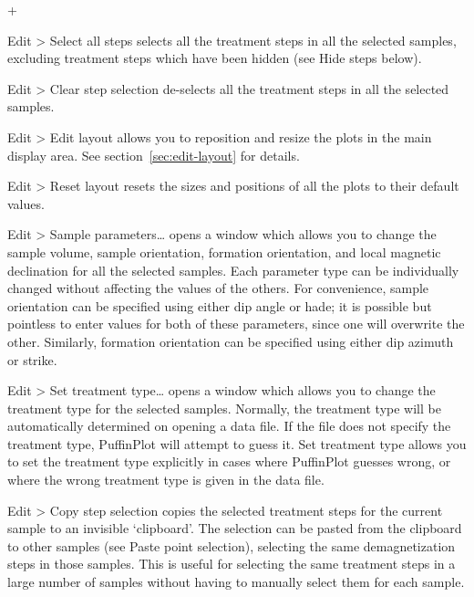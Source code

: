 \documentclass[a4paper,british]{article}
\newcommand{\menuitemlabel}[1]{%
\mbox{\textsf{#1}}\hfil}
\newenvironment{menuitemlist}%
{\begin{list}{}{%
\renewcommand{\makelabel}{\menuitemlabel}%
\setlength{\labelwidth}{35pt}%
\setlength{\leftmargin}%
             {\labelwidth+\labelsep}}}%
{\end{list}}
\newcommand{\ppcmd}[1]{\textsf{#1}} %
\newcommand{\submenu}{ \textgreater{} } %
\begin{document}
\begin{menuitemlist}

\item[Edit\submenu Select all steps] selects all the treatment steps in all
  the selected samples, excluding treatment steps which have been hidden (see
  \ppcmd{Hide steps} below).

\item[Edit\submenu Clear step selection] de-selects all the treatment steps
  in all the selected samples.

\item[Edit\submenu Edit layout] allows you to reposition and resize the plots
  in the main display area. See section~\ref{sec:edit-layout} for details.

\item[Edit\submenu Reset layout] resets the sizes and positions of all the
  plots to their default values.

\item[Edit\submenu Sample parameters\ldots] opens a window which allows
  you to change the sample volume, sample orientation, formation
  orientation, and local magnetic declination for all the selected
  samples. Each parameter type can be individually changed without
  affecting the values of the others. For convenience, sample
  orientation can be specified using either dip angle or hade; it is
  possible but pointless to enter values for both of these parameters,
  since one will overwrite the other. Similarly, formation orientation
  can be specified using either dip azimuth or strike.

\item[Edit\submenu Set treatment type\ldots] opens a window which allows you
  to change the treatment type for the selected samples. Normally, the
  treatment type will be automatically determined on opening a data file. If
  the file does not specify the treatment type, PuffinPlot will attempt to
  guess it. \ppcmd{Set treatment type} allows you to set the treatment type
  explicitly in cases where PuffinPlot guesses wrong, or where the wrong
  treatment type is given in the data file.

\item[Edit\submenu Copy step selection] copies the selected treatment steps
  for the current sample to an invisible `clipboard'. The selection can be
  pasted from the clipboard to other samples (see \ppcmd{Paste point
    selection}), selecting the same demagnetization steps in those samples.
  This is useful for selecting the same treatment steps in a large number of
  samples without having to manually select them for each sample.


\end{menuitemlist}
\end{document}
